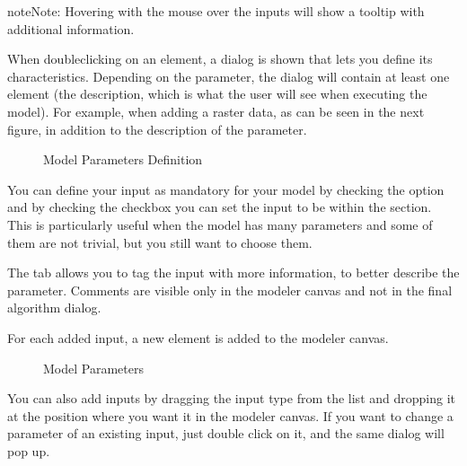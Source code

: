 \documentclass[letterpaper,10pt,english]{sphinxmanual}
\begin{document}
\begin{sphinxadmonition}{note}{Note:}
\sphinxAtStartPar
Hovering with the mouse over the inputs will show a tooltip with
additional information.
\end{sphinxadmonition}

\sphinxAtStartPar
When double\sphinxhyphen{}clicking on an element, a dialog is shown that lets
you define its characteristics.
Depending on the parameter, the dialog will contain at least one
element (the description, which is what the user will see when
executing the model).
For example, when adding a raster data, as can be seen in the next figure,
in addition to the description of the parameter.

\begin{figure}[H]
\centering
\capstart

\noindent{}
\caption{Model Parameters Definition}\label{\detokenize{Introduction/models:id2}}\label{\detokenize{Introduction/models:figure-model-parameter}}\end{figure}

\sphinxAtStartPar
You can define your input as mandatory for your model by checking the
  option and by checking the  
checkbox you can set the input to be within the  section. This is
particularly useful when the model has many parameters and some of them are not
trivial, but you still want to choose them.

\sphinxAtStartPar
The  tab allows you to tag the input with more information,
to better describe
the parameter. Comments are visible only in the modeler canvas and not in the
final algorithm dialog.

\sphinxAtStartPar
For each added input, a new element is added to the modeler canvas.

\begin{figure}[H]
\centering
\capstart

\noindent{}
\caption{Model Parameters}\label{\detokenize{Introduction/models:id3}}\label{\detokenize{Introduction/models:figure-model-parameter-canvas}}\end{figure}

\sphinxAtStartPar
You can also add inputs by dragging the input type from the list and
dropping it at the position where you want it in the modeler canvas. If you want
to change a parameter of an existing input, just double click on it, and the
same dialog will pop up.
\end{document}
